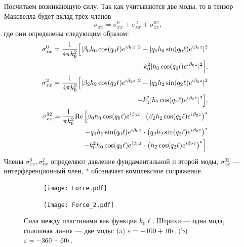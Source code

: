 Посчитаем возникающую силу. Так как учитываются две моды, то в тензор Максвелла будет вклад трёх членов
\begin{equation}
\sigma_{xx} = \sigma_{xx}^0 + \sigma_{xx}^2 + \sigma_{xx}^{02},
\end{equation}
где они определены следующим образом:
\begin{align}
\sigma_{xx}^{0} = \frac{1}{4 \pi k_0^2}\Bigl[\lvert\beta_{0} h_{0} \cos(q_{0}\ell) e^{i \beta_{0} z}\rvert^2   
-\lvert q_{0} h_{0} \sin(q_{0}\ell) e^{i \beta_{0} z}\rvert^2 \nonumber \\
- k_0^2\lvert h_{0} \cos(q_{0} l) e^{i \beta_{0} z}\rvert^2\Bigr],\nonumber\\
\sigma_{xx}^{2} = \frac{1}{4 \pi k_0^2}\Bigl[\lvert\beta_{2} h_{2} \cos(q_{2}\ell) e^{i \beta_{2} z}\rvert^2
-\lvert q_{2} h_{2} \sin(q_{2}\ell) e^{i \beta_{2} z}\rvert^2 \nonumber \\
- k_0^2\lvert h_{2} \cos(q_{2}\ell) e^{i \beta_{2} z}\rvert^2\Bigr],\nonumber\\
\sigma_{xx}^{02} = \frac{1}{ \pi k_0^2} \textrm{Re}\,\Bigl[  \beta_0 h_0 \cos(q_0\ell) e^{i \beta_0 z} \cdot \big(\beta_2 h_2 \cos(q_2\ell) e^{i \beta_2 z}\big)^{*}\nonumber\\
- q_0 h_0 \sin(q_0\ell) e^{i \beta_0 z} \cdot \big(q_2 h_2 \sin(q_2\ell) e^{i \beta_2 z}\big)^{*}\nonumber&\\
- k_0^2 h_0 \cos(q_0\ell) e^{i \beta_0 z} \cdot \big(h_2 \cos(q_2\ell) e^{i \beta_2 z}\big)^{*}\Bigr].&\nonumber
\end{align}
Члены $\sigma_{xx}^{0}, \sigma_{xx}^{2}$ определяют давление фундаментальной и второй моды, $\sigma_{xx}^{02}$  --- интерференционный член, * обозначает комплексное сопряжение.

\begin{figure}
  \begin{subfigure}[t]{0.75\textwidth}
    \texttt{[image: Force.pdf]}
    \caption{}
  \end{subfigure}
  \begin{subfigure}[t]{0.75\textwidth}
    \texttt{[image: Force\_2.pdf]}
    \caption{}
  \end{subfigure}
  \caption{Сила между пластинами как функция  $k_0 \ell$. Штрихи --- одна мода, сплошная линия --- две моды: (a) $\varepsilon=-100+10i$, (b) $\varepsilon = -360 + 60i$.}
  \label{fig:F}
\end{figure}

